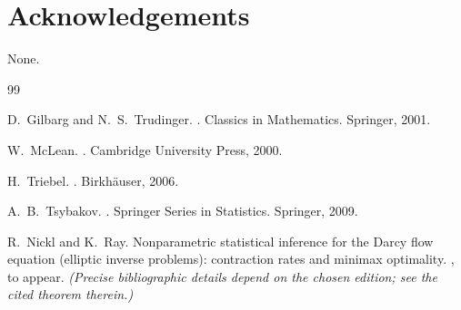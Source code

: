 \documentclass[11pt]{article}
\theoremstyle{definition}
\theoremstyle{remark}
\newcommand{\1}{\mathbf{1}}
\begin{document}
\section*{Acknowledgements}
None.

\begin{thebibliography}{99}

D.~Gilbarg and N.~S.~Trudinger.
.
\newblock Classics in Mathematics. Springer, 2001.

W.~McLean.
.
\newblock Cambridge University Press, 2000.

H.~Triebel.
.
\newblock Birkh\"auser, 2006.

A.~B.~Tsybakov.
.
\newblock Springer Series in Statistics. Springer, 2009.

R.~Nickl and K.~Ray.
\newblock Nonparametric statistical inference for the {D}arcy flow equation (elliptic inverse problems): contraction rates and minimax optimality.
, to appear. \emph{(Precise bibliographic details depend on the chosen edition; see the cited theorem therein.)}

\end{thebibliography}
\end{document}
